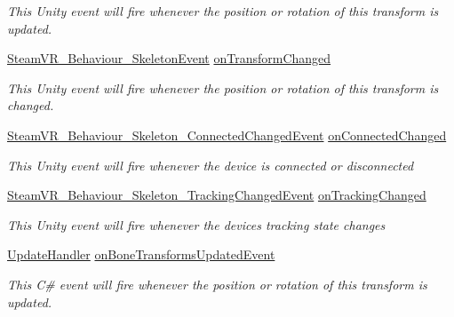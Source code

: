 \begin{DoxyCompactItemize}
\begin{DoxyCompactList}\small\item\em This Unity event will fire whenever the position or rotation of this transform is updated. \end{DoxyCompactList}\item 
\mbox{\hyperlink{class_valve_1_1_v_r_1_1_steam_v_r___behaviour___skeleton_event}{Steam\+V\+R\+\_\+\+Behaviour\+\_\+\+Skeleton\+Event}} \mbox{\hyperlink{class_valve_1_1_v_r_1_1_steam_v_r___behaviour___skeleton_a8078be6c149808098657e2bc9fcdd0c3}{on\+Transform\+Changed}}
\begin{DoxyCompactList}\small\item\em This Unity event will fire whenever the position or rotation of this transform is changed. \end{DoxyCompactList}\item 
\mbox{\hyperlink{class_valve_1_1_v_r_1_1_steam_v_r___behaviour___skeleton___connected_changed_event}{Steam\+V\+R\+\_\+\+Behaviour\+\_\+\+Skeleton\+\_\+\+Connected\+Changed\+Event}} \mbox{\hyperlink{class_valve_1_1_v_r_1_1_steam_v_r___behaviour___skeleton_a5b269c83dc2ddb5b08a228a33f3be367}{on\+Connected\+Changed}}
\begin{DoxyCompactList}\small\item\em This Unity event will fire whenever the device is connected or disconnected \end{DoxyCompactList}\item 
\mbox{\hyperlink{class_valve_1_1_v_r_1_1_steam_v_r___behaviour___skeleton___tracking_changed_event}{Steam\+V\+R\+\_\+\+Behaviour\+\_\+\+Skeleton\+\_\+\+Tracking\+Changed\+Event}} \mbox{\hyperlink{class_valve_1_1_v_r_1_1_steam_v_r___behaviour___skeleton_afcbb0bb75e8797c87767fcf0eb4c4884}{on\+Tracking\+Changed}}
\begin{DoxyCompactList}\small\item\em This Unity event will fire whenever the device\textquotesingle{}s tracking state changes \end{DoxyCompactList}\item 
\mbox{\hyperlink{class_valve_1_1_v_r_1_1_steam_v_r___behaviour___skeleton_aca86be067e5094667bce3ba86677dd0b}{Update\+Handler}} \mbox{\hyperlink{class_valve_1_1_v_r_1_1_steam_v_r___behaviour___skeleton_a2631717d86946b7d2d8979b60eb4fc9a}{on\+Bone\+Transforms\+Updated\+Event}}
\begin{DoxyCompactList}\small\item\em This C\# event will fire whenever the position or rotation of this transform is updated. \end{DoxyCompactList}\item 

\end{DoxyCompactItemize}
